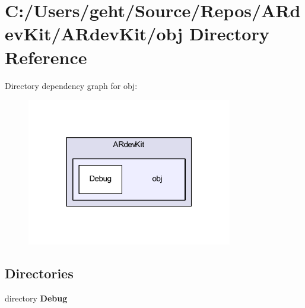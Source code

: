 \section{C\-:/\-Users/geht/\-Source/\-Repos/\-A\-Rdev\-Kit/\-A\-Rdev\-Kit/obj Directory Reference}
\label{dir_b93999a4df7abde888924ac2b64439b1}
Directory dependency graph for obj\-:
\nopagebreak
\begin{figure}[H]
\begin{center}
\leavevmode
\includegraphics[width=254pt]{dir_b93999a4df7abde888924ac2b64439b1_dep}
\end{center}
\end{figure}
\subsection*{Directories}
\begin{DoxyCompactItemize}
\item 
directory {\bf Debug}
\end{DoxyCompactItemize}
